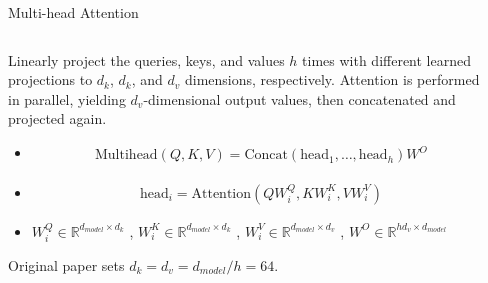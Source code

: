 \documentclass[aspectratio=169,xcolor=dvipsnames,svgnames,x11names,fleqn]{beamer}
\begin{document}
\begin{frame}{Multi-head Attention}

\footnotesize

\begin{columns}[T]
    \begin{column}{0.55\textwidth}
        \begin{tcolorbox}[colback=blue!5, colframe=blue!75!black]
            Linearly project the queries, keys, and values $h$ times with different learned projections to $d_k$, $d_k$, and $d_v$ dimensions, respectively. Attention is performed in parallel, yielding $d_v$-dimensional output values, then concatenated and projected again.
        \end{tcolorbox}

        
        \begin{itemize}
            \item \begin{align*}
                \text{Multihead}(Q, K, V) = \text{Concat}(\text{head}_1, \dots, \text{head}_h)W^O
            \end{align*}
            
            \item  \begin{align*}
                \text{head}_i = \text{Attention}(QW_i^Q, KW_i^K, VW_i^V)
            \end{align*}
            
            \item  $W_i^Q \in \mathbb{R}^{d_{model} \times d_k}$
               , $W_i^K \in \mathbb{R}^{d_{model} \times d_k}$
               , $W_i^V \in \mathbb{R}^{d_{model} \times d_v}$
                , $W^O \in \mathbb{R}^{hd_v \times d_{model}}$
        \end{itemize}
        
        Original paper sets $d_k = d_v = d_{model}/h = 64$.
    \end{column}

    \begin{column}{0.45\textwidth}
        \centering
       \resizebox{!}{0.7\textheight}{
\begin{tikzpicture}[
    node distance=0.8cm and 0.5cm,
    block/.style={
        rectangle, 
        draw=black, 
        thick, 
        fill=white, 
        minimum width=1.5cm, 
        minimum height=0.7cm, 
        align=center, 
        rounded corners=2pt
    },
    linear/.style={block, fill=gray!10},
    concat/.style={block, fill=yellow!20},
    attention/.style={block, fill=purple!20, minimum width=5cm, minimum height=1cm},
    arrow/.style={-Stealth, thick}
]


\end{tikzpicture}}
\end{column}
\end{columns}
\end{frame}
\end{document}
